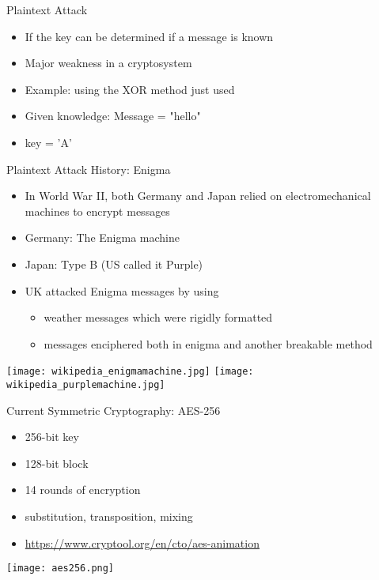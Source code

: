 \begin{withoutheadline}
\begin{frame}{Plaintext Attack}
    \begin{itemize}
        \item If the key can be determined if a message is known
        \item Major weakness in a cryptosystem
        \item Example: using the XOR method just used
        \item Given knowledge: Message = "hello"
        \item key = 'A'
    \end{itemize}
\end{frame}

\begin{frame}{Plaintext Attack History: Enigma}
    \begin{itemize}
        \item In World War II, both Germany and Japan relied on electromechanical machines to encrypt messages
        \item Germany: The Enigma machine
        \item Japan: Type B (US called it Purple)
        \item UK attacked Enigma messages by using
        \begin{itemize} 
            \item weather messages which were rigidly formatted
            \item messages enciphered both in enigma and another breakable method
        \end{itemize}
    \end{itemize}
    \texttt{[image: wikipedia\_enigmamachine.jpg]}
    \texttt{[image: wikipedia\_purplemachine.jpg]}
\end{frame}

\begin{frame}{Current Symmetric Cryptography: AES-256}
    \begin{itemize}
        \item 256-bit key
        \item 128-bit block
        \item 14 rounds of encryption
        \item substitution, transposition, mixing
        \item \url{https://www.cryptool.org/en/cto/aes-animation}
    \end{itemize}
    \texttt{[image: aes256.png]}
\end{frame}


\end{withoutheadline}
